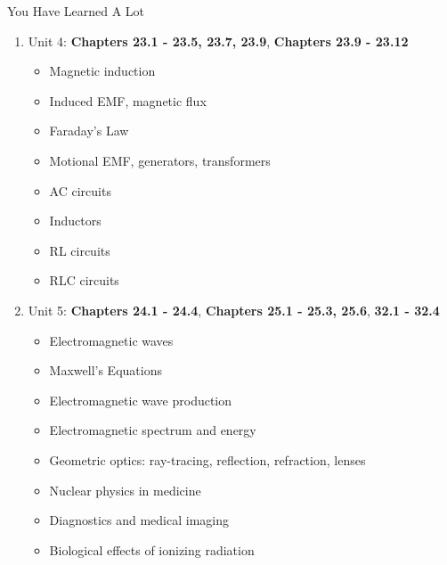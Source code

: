 \documentclass{beamer}
\begin{document}
\begin{frame}{You Have Learned A Lot}
\scriptsize
\begin{enumerate}
\scriptsize
\item Unit 4: \textbf{Chapters 23.1 - 23.5, 23.7, 23.9}, \textbf{Chapters 23.9 - 23.12}
\begin{itemize}
\scriptsize
\item Magnetic induction
\item Induced EMF, magnetic flux
\item Faraday's Law
\item Motional EMF, generators, transformers
\item AC circuits
\item Inductors
\item RL circuits
\item RLC circuits
\end{itemize}
\scriptsize
\item Unit 5: \textbf{Chapters 24.1 - 24.4}, \textbf{Chapters 25.1 - 25.3, 25.6}, \textbf{32.1 - 32.4}
\begin{itemize}
\scriptsize
\item Electromagnetic waves
\item Maxwell's Equations
\item Electromagnetic wave production
\item Electromagnetic spectrum and energy
\item Geometric optics: ray-tracing, reflection, refraction, lenses
\item Nuclear physics in medicine
\item Diagnostics and medical imaging
\item Biological effects of ionizing radiation
\end{itemize}
\end{enumerate}
\end{frame}
\end{document}
